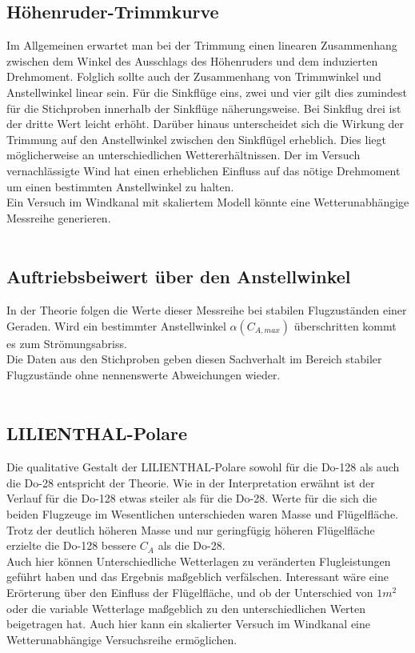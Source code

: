 \subsection{Höhenruder-Trimmkurve}

Im Allgemeinen erwartet man bei der Trimmung einen linearen Zusammenhang zwischen dem Winkel des Ausschlags des Höhenruders und dem induzierten Drehmoment. Folglich sollte auch der Zusammenhang von Trimmwinkel und Anstellwinkel linear sein. Für die Sinkflüge eins, zwei und vier gilt dies zumindest für die Stichproben innerhalb der Sinkflüge näherungsweise. Bei Sinkflug drei ist der dritte Wert leicht erhöht. Darüber hinaus unterscheidet sich die Wirkung der Trimmung auf den Anstellwinkel zwischen den Sinkflügel erheblich. Dies liegt möglicherweise an unterschiedlichen Wettererhältnissen. Der im Versuch vernachlässigte Wind hat einen erheblichen Einfluss auf das nötige Drehmoment um einen bestimmten Anstellwinkel zu halten.\\
Ein Versuch im Windkanal mit skaliertem Modell könnte eine Wetterunabhängige Messreihe generieren.\\\\

\subsection{Auftriebsbeiwert über den Anstellwinkel}

In der Theorie folgen die Werte dieser Messreihe bei stabilen Flugzuständen einer Geraden. Wird ein bestimmter Anstellwinkel $\alpha({C_{A,max}})$ überschritten kommt es zum Strömungsabriss.\\
Die Daten aus den Stichproben geben diesen Sachverhalt im Bereich stabiler Flugzustände ohne nennenswerte Abweichungen wieder.\\\\

\subsection{LILIENTHAL-Polare}

Die qualitative Gestalt der LILIENTHAL-Polare sowohl für die Do-128 als auch die Do-28 entspricht der Theorie. Wie in der Interpretation erwähnt ist der Verlauf für die Do-128 etwas steiler als für die Do-28. Werte für die sich die beiden Flugzeuge im Wesentlichen unterschieden waren Masse und Flügelfläche. Trotz der deutlich höheren Masse und nur geringfügig höheren Flügelfläche erzielte die Do-128 bessere $C_{A}$ als die Do-28.\\
Auch hier können Unterschiedliche Wetterlagen zu veränderten Flugleistungen geführt haben und das Ergebnis maßgeblich verfälschen.
Interessant wäre eine Erörterung über den Einfluss der Flügelfläche, und ob der Unterschied von $1m^{2}$ oder die variable Wetterlage maßgeblich zu den unterschiedlichen Werten beigetragen hat. Auch hier kann ein skalierter Versuch im Windkanal eine Wetterunabhängige Versuchsreihe ermöglichen.\\\\

